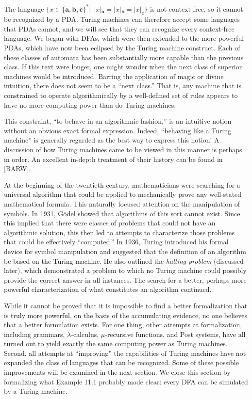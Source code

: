 The language $\{x\in\{\pmb{a},\pmb{b},\pmb{c}\}^*|\ \ |x|_{\pmb{a}}=|x|_{\pmb{b}}
=|x|_{\pmb{c}}\}$ is not context free, so it cannot be recognized by a PDA.
Turing machines can therefore accept some languages that PDAs cannot, and we
will see that they can recognize every context-free language. We began with DFAs,
which were then extended to the more powerful PDAs, which have now been eclipsed
by the Turing machine construct. Each of these classes of automata has been
substantially more capable than the previous class. If this text were longer,
one might wonder when the next class of superior machines would be introduced.
Barring the application of magic or divine intuition, there does not seem to be
a ``next class.'' That is, any machine that is constrained to operate
algorithmically by a well-defined set of rules appears to have no more computing
power than do Turing machines.

This constraint, ``to behave in an algorithmic fashion,'' is an intuitive notion
without an obvious exact formal expression. Indeed, ``behaving like a Turing
machine'' is generally regarded as the best way to express this notion! A
discussion of how Turing machines came to be viewed in this manner is perhaps in
order. An excellent in-depth treatment of their history can be found in [BARW].

At the beginning of the twentieth century, mathematicians were searching for a
universal algorithm that could be applied to mechanically prove any well-stated
mathematical formula. This naturally focused attention on the manipulation of
symbols. In 1931, G\"odel showed that algorithms of this sort cannot exist. Since
this implied that there were classes of problems that could not have an
algorithmic solution, this then led to attempts to characterize those problems
that could be effectively ``computed.'' In 1936, Turing introduced his formal
device for symbol manipulation and suggested that the definition of an algorithm
be based on the Turing machine. He also outlined the \emph{halting problem}
(discussed later), which demonstrated a problem to which no Turing
machine could possibly provide the correct answer in all instances. The search
for a better, perhaps more powerful characterization of what constitutes an
algorithm continued.

While it cannot be proved that it is impossible to find a better formalization
that is truly more powerful, on the basis of the accumulating evidence, no one
believes that a better formulation exists. For one thing, other attempts at
formalization, including grammars, $\lambda$-calculus, $\mu$-recursive
functions, and Post systems, have all turned out to yield exactly the same
computing power as Turing machines. Second, all attempts at ``improving'' the
capabilities of Turing machines have not expanded the class of languages that
can be recognized. Some of these possible improvements will be examined in the
next section. We close this section by formalizing what Example 11.1 probably
made clear: every DFA can be simulated by a Turing machine.

